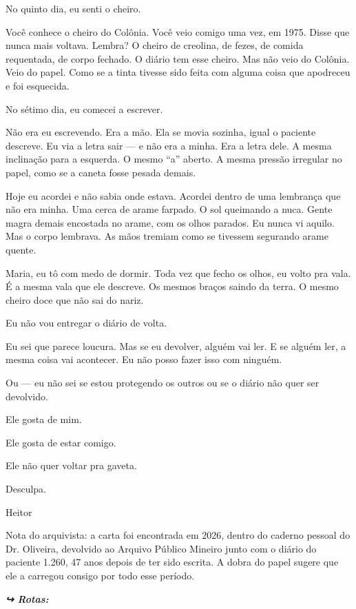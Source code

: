 \noindent No quinto dia, eu senti o cheiro.

\noindent Você conhece o cheiro do Colônia. Você veio comigo uma vez, em 1975.
\noindent Disse que nunca mais voltava. Lembra? O cheiro de creolina, de fezes, de
\noindent comida requentada, de corpo fechado. O diário tem esse cheiro. Mas não veio
\noindent do Colônia. Veio do papel. Como se a tinta tivesse sido feita com alguma
\noindent coisa que apodreceu e foi esquecida.

\noindent No sétimo dia, eu comecei a escrever.

\noindent Não era eu escrevendo. Era a mão. Ela se movia sozinha, igual o
\noindent paciente descreve. Eu via a letra sair --- e não era a minha. Era a letra
\noindent dele. A mesma inclinação para a esquerda. O mesmo \textquotedblleft{}a\textquotedblright{} aberto. A mesma
\noindent pressão irregular no papel, como se a caneta fosse pesada demais.

\noindent Hoje eu acordei e não sabia onde estava. Acordei dentro de uma
\noindent lembrança que não era minha. Uma cerca de arame farpado. O sol queimando
\noindent a nuca. Gente magra demais encostada no arame, com os olhos parados. Eu
\noindent nunca vi aquilo. Mas o corpo lembrava. As mãos tremiam como se tivessem
\noindent segurando arame quente.

\noindent Maria, eu tô com medo de dormir. Toda vez que fecho os olhos, eu
\noindent volto pra vala. É a mesma vala que ele descreve. Os mesmos braços saindo
\noindent da terra. O mesmo cheiro doce que não sai do nariz.

\noindent Eu não vou entregar o diário de volta.

\noindent Eu sei que parece loucura. Mas se eu devolver, alguém vai ler. E se
\noindent alguém ler, a mesma coisa vai acontecer. Eu não posso fazer isso com
\noindent ninguém.

\noindent Ou --- eu não sei se estou protegendo os outros ou se o diário não
\noindent quer ser devolvido.

\noindent Ele gosta de mim.

\noindent Ele gosta de estar comigo.

\noindent Ele não quer voltar pra gaveta.

\noindent Desculpa.

\noindent Heitor

\noindent Nota do arquivista: a carta foi encontrada em 2026, dentro do caderno pessoal do Dr. Oliveira, devolvido ao Arquivo Público Mineiro junto com o diário do paciente 1.260, 47 anos depois de ter sido escrita. A dobra do papel sugere que ele a carregou consigo por todo esse período.

\vspace{0.5em}
\noindent\textit{\textbf{↪ Rotas:}  \rotasep {} \rotasep {}}
